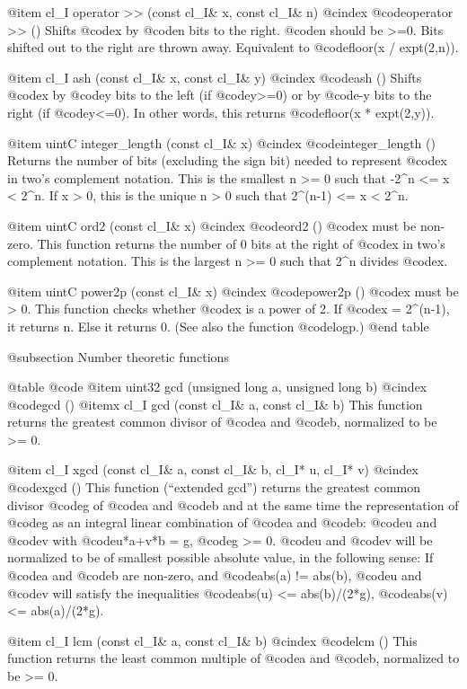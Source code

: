 @item cl_I operator >> (const cl_I& x, const cl_I& n)
@cindex @code{operator >> ()}
Shifts @code{x} by @code{n} bits to the right. @code{n} should be >=0.
Bits shifted out to the right are thrown away.
Equivalent to @code{floor(x / expt(2,n))}.

@item cl_I ash (const cl_I& x, const cl_I& y)
@cindex @code{ash ()}
Shifts @code{x} by @code{y} bits to the left (if @code{y}>=0) or
by @code{-y} bits to the right (if @code{y}<=0). In other words, this
returns @code{floor(x * expt(2,y))}.

@item uintC integer_length (const cl_I& x)
@cindex @code{integer_length ()}
Returns the number of bits (excluding the sign bit) needed to represent @code{x}
in two's complement notation. This is the smallest n >= 0 such that
-2^n <= x < 2^n. If x > 0, this is the unique n > 0 such that
2^(n-1) <= x < 2^n.

@item uintC ord2 (const cl_I& x)
@cindex @code{ord2 ()}
@code{x} must be non-zero. This function returns the number of 0 bits at the
right of @code{x} in two's complement notation. This is the largest n >= 0
such that 2^n divides @code{x}.

@item uintC power2p (const cl_I& x)
@cindex @code{power2p ()}
@code{x} must be > 0. This function checks whether @code{x} is a power of 2.
If @code{x} = 2^(n-1), it returns n. Else it returns 0.
(See also the function @code{logp}.)
@end table


@subsection Number theoretic functions

@table @code
@item uint32 gcd (unsigned long a, unsigned long b)
@cindex @code{gcd ()}
@itemx cl_I gcd (const cl_I& a, const cl_I& b)
This function returns the greatest common divisor of @code{a} and @code{b},
normalized to be >= 0.

@item cl_I xgcd (const cl_I& a, const cl_I& b, cl_I* u, cl_I* v)
@cindex @code{xgcd ()}
This function (``extended gcd'') returns the greatest common divisor @code{g} of
@code{a} and @code{b} and at the same time the representation of @code{g}
as an integral linear combination of @code{a} and @code{b}:
@code{u} and @code{v} with @code{u*a+v*b = g}, @code{g} >= 0.
@code{u} and @code{v} will be normalized to be of smallest possible absolute
value, in the following sense: If @code{a} and @code{b} are non-zero, and
@code{abs(a) != abs(b)}, @code{u} and @code{v} will satisfy the inequalities
@code{abs(u) <= abs(b)/(2*g)}, @code{abs(v) <= abs(a)/(2*g)}.

@item cl_I lcm (const cl_I& a, const cl_I& b)
@cindex @code{lcm ()}
This function returns the least common multiple of @code{a} and @code{b},
normalized to be >= 0.

